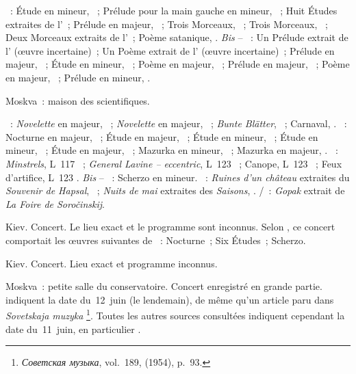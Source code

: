 \begin{description}
 \textsc{\Scriabine{}}~: Étude en \kC \Sharp mineur,  ~;
 Prélude pour la main gauche en \kC \Sharp mineur,  ~;
 Huit Études extraites de l'~; Prélude en \kE majeur, 
 ~; Trois Morceaux, ~; Trois Morceaux, ~; Deux
 Morceaux extraits de l'~; Poème satanique, .
 \emph{Bis} -- \textsc{\Scriabine{}}~: Un Prélude extrait de l'
 (œuvre incertaine)~; Un Poème extrait de l' (œuvre incertaine)~;
 Prélude en \kE \Flat majeur,  ~; Étude en \kD \Sharp
 mineur,  ~; Poème en \kF \Sharp majeur, 
 ~; Prélude en \kB majeur,  ~; Poème en \kD
 majeur,  ~; Prélude en \kF mineur,  .
 \item[\DateWithWeekDay{1954-05-10}]
 Moskva~: maison des scientifiques.

 \textsc{\Schumann{}}~: \emph{Novelette} en \kF majeur, 
 ~; \emph{Novelette} en \kE majeur,  ~;
 \emph{Bunte Blätter},  ~; Carnaval,
 .
 \textsc{\Chopin{}}~: Nocturne en \kF \Sharp majeur,  ~;
 Étude en \kG \Flat majeur,  ~; Étude en \kE \Flat
 mineur,  ~; Étude en \kF mineur,  ~;
 Étude en \kF majeur,  ~; Mazurka en \kF mineur,
  ~; Mazurka en \kC majeur,  .
 \textsc{\Debussy{}}~: \emph{Minstrels}, L~117 ~; \emph{General
 Lavine -- eccentric}, L~123 ~; Canope, L~123 ~;
 Feux d'artifice, L~123 .
 \emph{Bis} -- \textsc{\Goltz{}}~: Scherzo en \kE mineur.
 \textsc{\Tchaikovski{}}~: \emph{Ruines d'un château} extraites du
 \emph{Souvenir de Hapsal},  ~; \emph{Nuits de mai}
 extraites des \emph{Saisons},  .
 \textsc{\Moussorgski{}/\Rachmaninov{}}~: \emph{Gopak} extrait de \emph{La
 Foire de Soročinskij}.
 \item[\DateWithWeekDay{1954-05-25}]
 Kiev.
 Concert.
 Le lieu exact et le programme sont inconnus.
 Selon \ASofronitsky{}, ce concert comportait les œuvres suivantes de
 \Chopin{}~: Nocturne~; Six Études~; Scherzo.
 \item[\DateWithWeekDay{1954-05-27}]
 Kiev.
 Concert.
 Lieu exact et programme inconnus.
 \item[\DateWithWeekDay{1954-06-11}]
 Moskva~: petite salle du conservatoire.
 Concert enregistré en grande partie.
 \citet[p.~437]{Scriabine} indiquent la date du~12~juin (le lendemain), de
 même qu'un article paru dans \emph{Sovetskaja muzyka}%
 \footnote{\foreignlanguage{russian}{\emph{Советская музыка}}, vol.~189,
  (1954), p.~93.}.
 Toutes les autres sources consultées indiquent cependant la date
 du~11~juin, en particulier \citet[p.~177]{Nekrasova08}.


\end{description}
